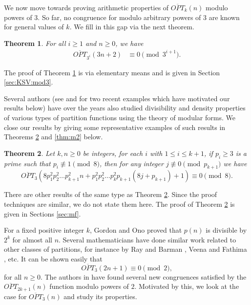 \documentclass[12pt,reqno]{amsart}
\numberwithin{equation}{section}
\newcommand{\opt}{\overline{OPT}}
\newtheorem{theorem}{Theorem}[section]
\begin{document}
We now move towards proving arithmetic properties of $\opt_k(n)$ modulo powers of $3$. So far, no congruence for modulo arbitrary powers of $3$ are known for general values of $k$. We fill in this gap via the next theorem.
\begin{theorem}\label{thm:KSV:mod3}
For all $i\geq1$ and $n\geq 0$, we have
    \begin{align}
    \opt_{3^i}(3n+2)&\equiv0\pmod{3^{i+1}}.\label{KSV:mod3:Cong1}
    \end{align}    
\end{theorem}
\noindent The proof of Theorem \ref{thm:KSV:mod3} is via elementary means and is given in Section \ref{sec:KSV:mod3}.

Several authors (see \cite{GoswamiJha} and \cite{Singh} for two recent examples which have motivated our results below) have over the years also studied divisibility and density properties of various types of partition functions using the theory of modular forms. We close our results by giving some representative examples of such results in Theorems \ref{thm:mf-1} and \ref{thm:m2} below.
\begin{theorem}\label{thm:mf-1}
    Let $k,n\geq 0$ be integers, for each $i$ with $1\leq i\leq k+1$, if $p_i\geq 3$ is a prime such that $p_i\not\equiv 1\pmod 8$, then for any integer $j\not\equiv 0\pmod{p_{k+1}}$ we have
    \[
    \opt_3(8p_1^2p_2^2\ldots p_{k+1}^2n+p_1^2p_2^2\ldots p_k^2p_{k+1}(8j+p_{k+1})+1)\equiv 0\pmod{8}.
    \]
\end{theorem}
\noindent There are other results of the same type as Theorem \ref{thm:mf-1}. Since the proof techniques are similar, we do not state them here. The proof of Theorem \ref{thm:mf-1} is given in Sections \ref{sec:mf}.

For a fixed positive integer $k$, Gordon and Ono \cite{GordonOno} proved that $p(n)$ is divisible by $2^k$ for almost all $n$. Several mathematicians have done similar work related to other classes of partitions, for instance by Ray and Barman \cite{RayBarman}, Veena and Fathima \cite{VeenaFathima}, etc. It can be shown easily \cite[Eq. (43)]{DremaSaikia} that
\[
\opt_3(2n+1)\equiv 0 \pmod 2,
\]
for all $n\geq 0$. The authors in \cite{SSS} have found several new congruences satisfied by the $\opt_{2k+1}(n)$ function modulo powers of $2$. Motivated by this, we look at the case for $\opt_3(n)$ and study its properties.


\end{document}
